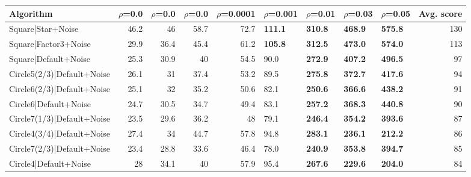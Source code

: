 \begin{tabular}{lrrrrllllr}
\hline
 Algorithm                                            &   $\rho$=0.0 &   $\rho$=0.0 &   $\rho$=0.0 &   $\rho$=0.0001 & $\rho$=0.001   & $\rho$=0.01    & $\rho$=0.03    & $\rho$=0.05    &   Avg. score \\
\hline
 Square|Star+Noise                                    &         46.2 &         46   &         58.7 &            72.7 & \textbf{111.1} & \textbf{310.8} & \textbf{468.9} & \textbf{575.8} &          130 \\
 Square|Factor3+Noise                                 &         29.9 &         36.4 &         45.4 &            61.2 & \textbf{105.8} & \textbf{312.5} & \textbf{473.0} & \textbf{574.0} &          113 \\
 Square|Default+Noise                                 &         25.3 &         30.9 &         40   &            54.5 & 90.0           & \textbf{272.9} & \textbf{407.2} & \textbf{496.5} &           97 \\
 Circle5(2/3)|Default+Noise                           &         26.1 &         31   &         37.4 &            53.2 & 89.5           & \textbf{275.8} & \textbf{372.7} & \textbf{417.6} &           94 \\
 Circle6(2/3)|Default+Noise                           &         25.1 &         32   &         35.2 &            50.6 & 82.1           & \textbf{250.6} & \textbf{366.6} & \textbf{438.2} &           91 \\
 Circle6|Default+Noise                                &         24.7 &         30.5 &         34.7 &            49.4 & 83.1           & \textbf{257.2} & \textbf{368.3} & \textbf{440.8} &           90 \\
 Circle7(1/3)|Default+Noise                           &         23.5 &         29.6 &         36.2 &            48   & 79.1           & \textbf{246.4} & \textbf{354.2} & \textbf{393.6} &           87 \\
 Circle4(3/4)|Default+Noise                           &         27.4 &         34   &         44.7 &            57.8 & 94.8           & \textbf{283.1} & \textbf{236.1} & \textbf{212.2} &           86 \\
 Circle7(2/3)|Default+Noise                           &         23.4 &         28.8 &         33.6 &            46.4 & 78.0           & \textbf{240.9} & \textbf{353.8} & \textbf{394.7} &           85 \\
 Circle4|Default+Noise                                &         28   &         34.1 &         40   &            57.9 & 95.4           & \textbf{267.6} & \textbf{229.6} & \textbf{204.0} &           84 \\

\end{tabular}
